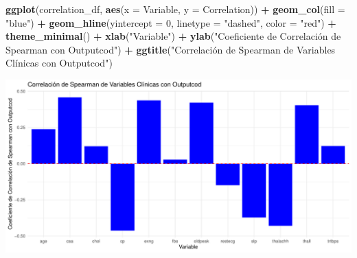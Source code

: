 \documentclass[
]{article}
\newenvironment{Shaded}{\begin{snugshade}}{\end{snugshade}}
\newcommand{\AttributeTok}[1]{\textcolor[rgb]{0.13,0.29,0.53}{#1}}
\newcommand{\DecValTok}[1]{\textcolor[rgb]{0.00,0.00,0.81}{#1}}
\newcommand{\FunctionTok}[1]{\textcolor[rgb]{0.13,0.29,0.53}{\textbf{#1}}}
\newcommand{\NormalTok}[1]{#1}
\newcommand{\SpecialCharTok}[1]{\textcolor[rgb]{0.81,0.36,0.00}{\textbf{#1}}}
\newcommand{\StringTok}[1]{\textcolor[rgb]{0.31,0.60,0.02}{#1}}
\begin{document}
\begin{Shaded}
\begin{Highlighting}[]
\FunctionTok{ggplot}\NormalTok{(correlation\_df, }\FunctionTok{aes}\NormalTok{(}\AttributeTok{x =}\NormalTok{ Variable, }\AttributeTok{y =}\NormalTok{ Correlation)) }\SpecialCharTok{+} 
  \FunctionTok{geom\_col}\NormalTok{(}\AttributeTok{fill =} \StringTok{"blue"}\NormalTok{) }\SpecialCharTok{+} \FunctionTok{geom\_hline}\NormalTok{(}\AttributeTok{yintercept =} \DecValTok{0}\NormalTok{, }\AttributeTok{linetype =} \StringTok{"dashed"}\NormalTok{, }\AttributeTok{color =} \StringTok{"red"}\NormalTok{) }\SpecialCharTok{+}
  \FunctionTok{theme\_minimal}\NormalTok{() }\SpecialCharTok{+}  \FunctionTok{xlab}\NormalTok{(}\StringTok{"Variable"}\NormalTok{) }\SpecialCharTok{+} \FunctionTok{ylab}\NormalTok{(}\StringTok{"Coeficiente de Correlación de Spearman con Outputcod"}\NormalTok{) }\SpecialCharTok{+}
  \FunctionTok{ggtitle}\NormalTok{(}\StringTok{"Correlación de Spearman de Variables Clínicas con Outputcod"}\NormalTok{)}
\end{Highlighting}
\end{Shaded}

\includegraphics{coyolaf_ChristianOyola-PRA2_files/figure-latex/unnamed-chunk-22-1.pdf}
\end{document}
